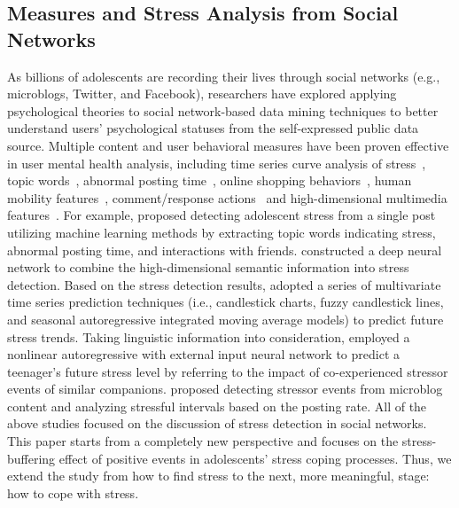 \documentclass[5p,times,numbers,authoryear]{elsarticle}
\begin{document}
\subsection{Measures and Stress Analysis from Social Networks}
As billions of adolescents are recording their lives through social networks (e.g., microblogs, Twitter, and Facebook), researchers have explored applying psychological theories to social network-based data mining techniques to better understand users' psychological statuses from the self-expressed public data source.
Multiple content and user behavioral measures have been
{proven}
effective in user mental health analysis,
including time series curve analysis of stress~\citep{Li2015When,Li2015Using}, topic words~\citep{XueUbicomp13}, abnormal posting time~\citep{Xue2014Detecting},
online shopping behaviors~\citep{DBLP:conf/apweb/Zhao0XLF16},
human mobility features~\citep{DBLP:conf/dasfaa/JinXLF16}, comment/response actions~\citep{Liang2015Teenagers}
and high-dimensional multimedia features~\citep{Lin2014User}.
For example, \citep{XueUbicomp13, Xue2014Detecting} proposed detecting adolescent stress from a single post utilizing machine learning methods by extracting topic words indicating stress, abnormal posting time, and interactions with friends.
\citep{Lin2014User} constructed a deep neural network to combine the high-dimensional   semantic information into stress detection.
Based on the stress detection results,
\citep{Li2015Predicting}\cite{Li2015Using}\cite{Li2015When} adopted a series of multivariate time series prediction techniques (i.e., candlestick charts, fuzzy candlestick lines, and seasonal autoregressive integrated moving average models) to predict future stress trends.
Taking  linguistic information into consideration,
\citep{Li2017Exploring} employed a nonlinear autoregressive with external input neural network to predict a teenager's future stress level by referring to the impact of co-experienced stressor events of similar companions.
\citep{Li2017Analyzing} proposed detecting stressor events from microblog content
and analyzing stressful intervals based on the posting rate.
All of the above studies focused on the discussion of stress detection in social networks.
This paper starts from a completely new perspective and focuses on the stress-buffering effect of positive events in adolescents' stress coping processes.
Thus, we extend the study from how to find stress to the next, more meaningful, stage: how to cope with stress.
\end{document}
